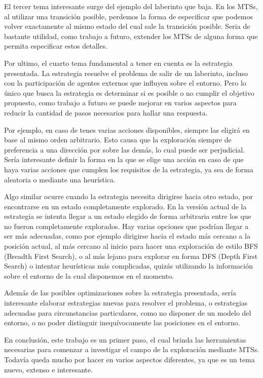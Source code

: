 \vspace{\baselineskip}
El tercer tema interesante surge del ejemplo del laberinto que baja. En los MTSs, al utilizar una transición posible, perdemos la forma
de especificar que podemos volver exactamente al mismo estado del cual sale la transición posible. Seria de bastante utilidad, como
trabajo a futuro, extender los MTSs de alguna forma que permita especificar estos detalles.

\vspace{\baselineskip}
Por ultimo, el cuarto tema fundamental a tener en cuenta es la estrategia presentada. La estrategia resuelve el problema de salir de
un laberinto, incluso con la participación de agentes externos que influyen sobre el entorno. Pero lo único que busca la estrategia
es determinar si es posible o no cumplir el objetivo propuesto, como trabajo a futuro se puede mejorar en varios aspectos para reducir
la cantidad de pasos necesarios para hallar una respuesta.

\vspace{\baselineskip}
Por ejemplo, en caso de tenes varias acciones disponibles, siempre las eligirá en base al mismo orden arbitrario. Esto causa que la
exploración siempre de preferencia a una dirección por sobre las demás, lo cual puede ser perjudicial. Sería interesante definir la
forma en la que se elige una acción en caso de que haya varias acciones que cumplen los requisitos de la estrategia, ya sea de forma
aleatoria o mediante una heurística.

\vspace{\baselineskip}
Algo similar ocurre cuando la estrategia necesita dirigirse hacia otro estado, por encontrarse en un estado completamente explorado.
En la versión actual de la estrategia se intenta llegar a un estado elegido de forma arbitraria entre los que no fueron completamente
explorados. Hay varias opciones que podrían llegar a ser más adecuadas, como por ejemplo dirigirse hacia el estado más cercano a la
posición actual, al más cercano al inicio para hacer una exploración de estilo BFS (Breadth First Search), o al más lejano para explorar
en forma DFS (Depth First Search) o intentar heurísticas más complicadas, quizás utilizando la información sobre el entorno de la cual
disponemos en el momento.

\vspace{\baselineskip}
Además de las posibles optimizaciones sobre la estrategia presentada, sería interesante elaborar estrategias nuevas para resolver el
problema, o estrategias adecuadas para circunstancias particulares, como no disponer de un modelo del entorno, o no poder distinguir
inequívocamente las posiciones en el entorno.

\vspace{\baselineskip}
En conclusión, este trabajo es un primer paso, el cual brinda las herramientas necesarias para comenzar a investigar el campo de la
exploración mediante MTSs. Todavía queda mucho por hacer en varios aspectos diferentes, ya que es un tema nuevo, extenso e interesante.